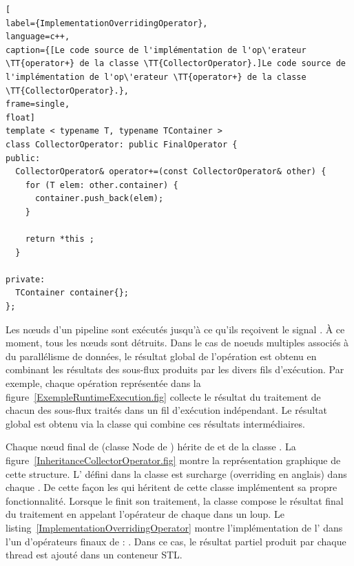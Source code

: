 \begin{lstlisting}[
label={ImplementationOverridingOperator},
language=c++,
caption={[Le code source de l'implémentation de l'op\'erateur \TT{operator+} de la classe \TT{CollectorOperator}.]Le code source de l'implémentation de l'op\'erateur \TT{operator+} de la classe \TT{CollectorOperator}.},
frame=single,
float]
template < typename T, typename TContainer >
class CollectorOperator: public FinalOperator {
public:
  CollectorOperator& operator+=(const CollectorOperator& other) {
    for (T elem: other.container) {
      container.push_back(elem);
    }

    return *this ;
  }	
  
private:
  TContainer container{};
};
\end{lstlisting}

Les nœuds d'un pipeline sont ex\'ecut\'es jusqu'\`a ce qu'ils re\c coivent le signal . \`A ce moment, tous les nœuds sont d\'etruits. Dans le cas de noeuds multiples associ\'es \`a du parall\'elisme de donn\'ees, le r\'esultat global de l'op\'eration est obtenu en combinant les r\'esultats des sous-flux produits par les divers fils d'ex\'ecution. Par exemple, chaque op\'eration  repr\'esent\'ee dans la figure~\ref{ExempleRuntimeExecution.fig} collecte le r\'esultat du traitement de chacun des sous-flux trait\'es dans un fil d'ex\'ecution ind\'ependant. Le r\'esultat global est obtenu via la classe  qui combine ces r\'esultats interm\'ediaires. 

Chaque nœud final de  (classe Node de ) h\'erite de  et de la classe . La figure~\ref{InheritanceCollectorOperator.fig} montre la repr\'esentation graphique de cette structure. L' d\'efini dans la classe  est surcharge (overriding en anglais) dans chaque . De cette fa\c {c}on les  qui h\'eritent de cette classe impl\'ementent sa propre fonctionnalit\'e. Lorsque le  finit son traitement, la classe  compose le r\'esultat final du traitement en appelant l'op\'erateur  de chaque  dans un loup. Le listing~\ref{ImplementationOverridingOperator} montre l'impl\'ementation de l' dans l'un d'op\'erateurs finaux de  : . Dans ce cas, le r\'esultat partiel produit par chaque thread est ajout\'e dans un conteneur STL.


